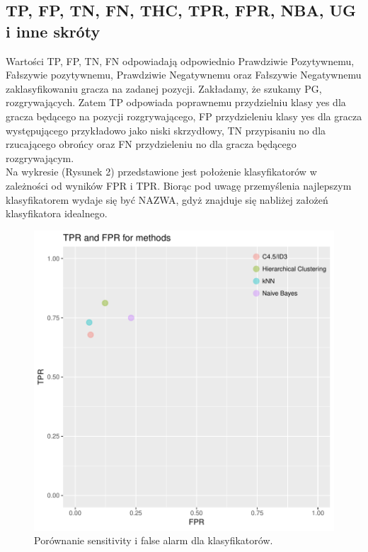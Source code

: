 \documentclass[twoside,twocolumn]{article}
\begin{document}
\subsection{TP, FP, TN, FN, THC, TPR, FPR, NBA, UG i inne skróty}
Wartości TP, FP, TN, FN odpowiadają odpowiednio Prawdziwie Pozytywnemu, Fałszywie pozytywnemu, Prawdziwie Negatywnemu oraz Fałszywie Negatywnemu zaklasyfikowaniu gracza na zadanej pozycji. Zakładamy, że szukamy PG, rozgrywających. Zatem TP odpowiada poprawnemu przydzielniu klasy yes dla gracza będącego na pozycji rozgrywającego, FP przydzieleniu klasy yes dla gracza występującego przykładowo jako niski skrzydłowy, TN przypisaniu no dla rzucającego obrońcy oraz FN przydzieleniu no dla gracza będącego rozgrywającym.
\\
Na wykresie (Rysunek 2) przedstawione jest położenie klasyfikatorów w zależności od wyników FPR i TPR. Biorąc pod uwagę przemyślenia najlepszym klasyfikatorem wydaje się być NAZWA, gdyż znajduje się nabliżej założeń klasyfikatora idealnego.
\begin{figure}[hbt!]
  \centering
    \includegraphics[width=\linewidth]{plot_ROCspace.pdf}
  \caption{Porównanie sensitivity i false alarm dla klasyfikatorów.}
  \label{fig:coffee}
\end{figure}
\end{document}
